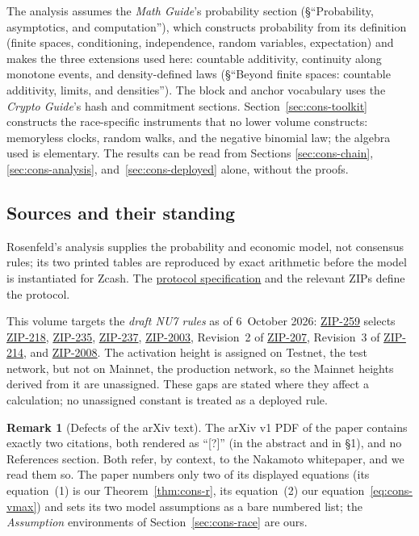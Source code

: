\documentclass[11pt,a4paper]{article}
\theoremstyle{definition}
\newtheorem{remark}[theorem]{Remark}
\begin{document}
The analysis assumes the \emph{Math Guide}'s probability section
(\S``Probability, asymptotics, and computation''), which constructs
probability from its definition (finite spaces, conditioning, independence,
random variables, expectation) and makes the three extensions used here:
countable additivity, continuity along monotone events, and density-defined
laws (\S``Beyond finite spaces: countable additivity, limits, and
densities''). The block and anchor vocabulary uses the \emph{Crypto Guide}'s
hash and commitment sections. Section~\ref{sec:cons-toolkit} constructs the
race-specific instruments that no lower volume constructs: memoryless clocks,
random walks, and the negative binomial law; the algebra used is elementary.
The results can be read from Sections \ref{sec:cons-chain},
\ref{sec:cons-analysis}, and~\ref{sec:cons-deployed} alone, without the
proofs.

\subsection{Sources and their standing}\label{sec:cons-sources}
\label{tab:cons-sources}

Rosenfeld's analysis supplies the probability and economic model, not
consensus rules; its two printed tables are reproduced by exact arithmetic
before the model is instantiated for Zcash. The
\href{https://zips.z.cash/protocol/protocol.pdf}{protocol specification}
and the relevant ZIPs define the protocol.

This volume targets the \emph{draft NU7 rules} as of 6~October 2026:
\href{https://zips.z.cash/zip-0259}{ZIP-259} selects
\href{https://zips.z.cash/zip-0218}{ZIP-218},
\href{https://zips.z.cash/zip-0235}{ZIP-235},
\href{https://zips.z.cash/zip-0237}{ZIP-237},
\href{https://zips.z.cash/zip-2003}{ZIP-2003},
Revision~2 of \href{https://zips.z.cash/zip-0207}{ZIP-207},
Revision~3 of \href{https://zips.z.cash/zip-0214}{ZIP-214}, and
\href{https://zips.z.cash/zip-2008}{ZIP-2008}. The activation height is
assigned on Testnet, the test network, but not on Mainnet, the production
network, so the Mainnet heights derived from it are unassigned. These gaps
are stated where they affect a calculation; no unassigned constant is
treated as a deployed rule.

\begin{remark}[Defects of the arXiv text]\label{rem:cons-paper}
The arXiv v1 PDF of the paper contains exactly two citations, both rendered
as ``[?]'' (in the abstract and in \S1), and no References section. Both
refer, by context, to the Nakamoto whitepaper, and we read them so. The paper
numbers only two of its displayed equations (its equation~(1) is our
Theorem~\ref{thm:cons-r}, its equation~(2) our
equation~\eqref{eq:cons-vmax}) and sets its two model assumptions as a bare
numbered list; the \emph{Assumption} environments of
Section~\ref{sec:cons-race} are ours.
\end{remark}
\end{document}
